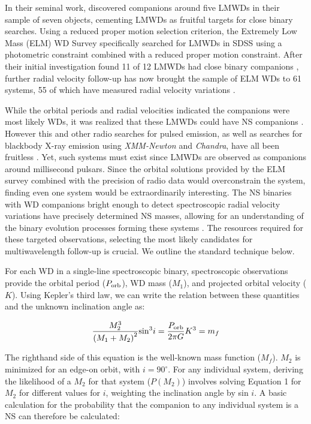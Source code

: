 \documentclass[apjl]{emulateapj}
\begin{document}
In their seminal work, \citet{marsh95} discovered companions around five LMWDs in their sample of seven objects, cementing LMWDs as fruitful targets for close binary searches. Using a reduced proper motion selection criterion, the Extremely Low Mass (ELM) WD Survey specifically searched for LMWDs in SDSS using a photometric constraint combined with a reduced proper motion constraint. After their initial investigation found 11 of 12 LMWDs had close binary companions \citep{ELMI}, further radial velocity follow-up has now brought the sample of ELM WDs to 61 systems, 55 of which have measured radial velocity variations \citep{ELMII, ELMIII, ELMIV, ELMV}.


While the orbital periods and radial velocities indicated the companions were most likely WDs, it was realized that these LMWDs could have NS companions \citep{vLeeuwen07}. However this and other radio searches for pulsed emission, as well as searches for blackbody X-ray emission using {\it XMM-Newton} and {\it Chandra}, have all been fruitless \citep{agueros09a,agueros09b,kilic13}. Yet, such systems must exist since LMWDs are observed as companions around millisecond pulsars. Since the orbital solutions provided by the ELM survey combined with the precision of radio data would overconstrain the system, finding even one system would be extraordinarily interesting. The NS binaries with WD companions bright enough to detect spectroscopic radial velocity variations have precisely determined NS masses, allowing for an understanding of the binary evolution processes forming these systems \citep{vKerkwijk96,callanan98,bassa06,antoniadis12}. The resources required for these targeted observations, selecting the most likely candidates for multiwavelength follow-up is crucial. We outline the standard technique below.


For each WD in a single-line spectroscopic binary, spectroscopic observations provide the orbital period ($P_{\rm orb}$), WD mass ($M_1$), and projected orbital velocity ($K$). Using Kepler's third law, we can write the relation between these quantities and the unknown inclination angle as:

\begin{equation}
	\frac{M_2^3}{\left(M_1+M_2\right)^2} {\rm sin}^3 i = \frac{P_{\rm orb}}{2\pi G} K^3 = m_f \label{eq:massfunc}
\end{equation}

The righthand side of this equation is the well-known mass function ($M_f$). $M_2$ is minimized for an edge-on orbit, with $i = 90^{\circ}$. For any individual system, deriving the likelihood of a $M_2$ for that system ($P(M_2)$) involves solving Equation 1 for $M_2$ for different values for $i$, weighting the inclination angle by sin $i$. A basic calculation for the probability that the companion to any individual system is a NS can therefore be calculated:
\end{document}
